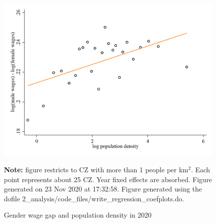 \begin{figure}[!h]
\centering
\caption{Gender wage gap and population density in 2020}
\includegraphics[width=1\textwidth]{../2_analysis/output/figures/l_czone_density_2020}
\par \begin{minipage}[h]{\textwidth}{\tiny\textbf{Note:} figure restricts to CZ with more than 1 people per km$^2$. Each point represents about 25 CZ. Year fixed effects are absorbed. Figure generated on 23 Nov 2020 at 17:32:58. Figure generated using the dofile 2\_analysis/code\_files/write\_regression\_coefplots.do.}\end{minipage}
\end{figure}
